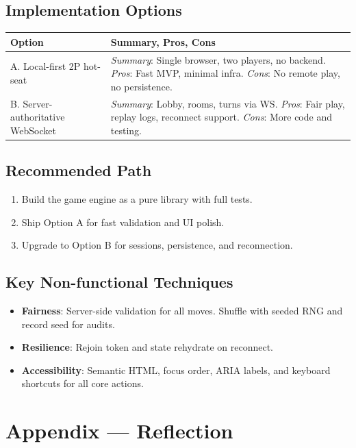\documentclass[12pt]{article}
\begin{document}
\subsection{Implementation Options}
\begin{tabularx}{\textwidth}{lX}
  \toprule
  \textbf{Option} & \textbf{Summary, Pros, Cons} \\
  \midrule
  A. Local-first 2P hot-seat & \textit{Summary}: Single browser, two players, no backend. \textit{Pros}: Fast MVP, minimal infra. \textit{Cons}: No remote play, no persistence. \\
  \midrule
  B. Server-authoritative WebSocket & \textit{Summary}: Lobby, rooms, turns via WS. \textit{Pros}: Fair play, replay logs, reconnect support. \textit{Cons}: More code and testing. \\
  \midrule
\end{tabularx}

\subsection{Recommended Path}
\begin{enumerate}
  \item Build the game engine as a pure library with full tests.
  \item Ship Option A for fast validation and UI polish.
  \item Upgrade to Option B for sessions, persistence, and reconnection.
\end{enumerate}

\subsection{Key Non-functional Techniques}
\begin{itemize}
  \item \textbf{Fairness}: Server-side validation for all moves. Shuffle with seeded RNG and record seed for audits.
  \item \textbf{Resilience}: Rejoin token and state rehydrate on reconnect.
  \item \textbf{Accessibility}: Semantic HTML, focus order, ARIA labels, and keyboard shortcuts for all core actions.
\end{itemize}

\newpage{}
\section*{Appendix --- Reflection}




\end{document}
